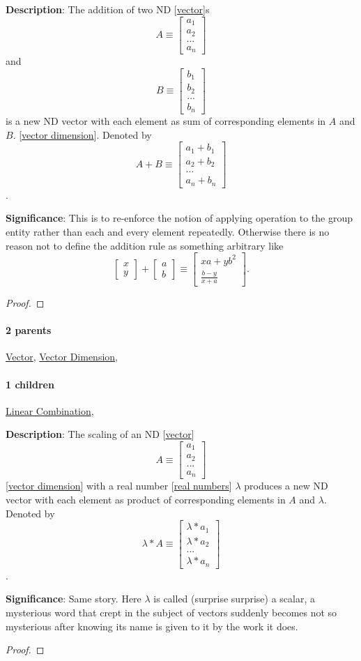 \documentclass[../main.tex]{subfiles}
\newcommand{\bvectwo}[2]{\begin{bmatrix} #1 \\ #2 \end{bmatrix}}
\newcommand{\bvecn}[1]{\begin{bmatrix} #1_1 \\ #1_2 \\ ... \\ #1_n \end{bmatrix}}
\newcommand{\bvecnsum}[2]{\begin{bmatrix} #1_1 + #2_1 \\ #1_2 + #2_2 \\ ... \\ #1_n + #2_n \end{bmatrix}}
\newcommand{\bvecnscale}[2]{\begin{bmatrix} #1 * #2_1 \\ #1 * #2_2 \\ ... \\ #1 * #2_n \end{bmatrix}}
\begin{document}
\begin{statement}
\label{statement:Vector Addition}\hspace*{0pt}\par
\end{statement}
\textbf{Description}:
  The addition of two ND [\hyperref[statement:Vector]{vector}]s \[ A \equiv \bvecn{a} \] and \[ B \equiv \bvecn{b} \] is a new ND vector with each element as sum of corresponding elements in $A$ and $B$.
   [\hyperref[statement:Vector Dimension]{vector dimension}]. Denoted by \[ A + B \equiv \bvecnsum{a}{b} \].
\par
{\color{magenta} \textbf{Significance}:
  This is to re-enforce the notion of applying operation to the group entity rather than each and every element repeatedly.
  Otherwise there is no reason not to define the addition rule as something arbitrary like
  \[
    \bvectwo{x}{y} + \bvectwo{a}{b} \equiv \bvectwo{xa + yb^2}{\frac{b - y}{x + a}}
  .\]
\par}
\begin{proof}
\proofbydefinition
\end{proof}\par
\paragraph{2 parents} \hyperref[statement:Vector]{Vector}, \hyperref[statement:Vector Dimension]{Vector Dimension}, 
\paragraph{1 children} \hyperref[statement:Linear Combination]{Linear Combination}, 



\begin{statement}
\label{statement:Vector Scaling}\hspace*{0pt}\par
\end{statement}
\textbf{Description}:
  The scaling of an ND [\hyperref[statement:Vector]{vector}] \[ A \equiv \bvecn{a} \] [\hyperref[statement:Vector Dimension]{vector dimension}] with a real number [\hyperref[statement:Real Numbers]{real numbers}] $\lambda$ produces a new ND vector with each element as product of corresponding elements in $A$ and $\lambda$. Denoted by \[ \lambda * A \equiv \bvecnscale{\lambda}{a} \].
\par
{\color{magenta} \textbf{Significance}:
  Same story. Here $\lambda$ is called (surprise surprise) a scalar, a mysterious word that crept in the subject of vectors suddenly becomes not so mysterious after knowing its name is given to it by the work it does.
\par}
\begin{proof}
\proofbydefinition
\end{proof}\par
\end{document}
